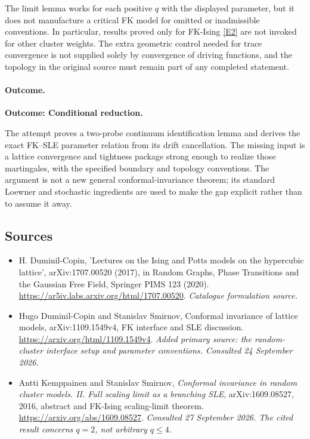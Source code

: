 \documentclass[11pt,a4paper]{article}
\newcommand{\eref}[2]{\hyperlink{extra:#1:#2}{[E#2]}}
\numberwithin{equation}{section}
\begin{document}
The limit lemma works for each positive $q$ with the displayed parameter,
but it does not manufacture a critical FK model for omitted or inadmissible
conventions. In particular, results proved only for FK-Ising
\eref{173}{2} are not invoked for other cluster weights. The extra geometric
control needed for trace convergence is not supplied solely by convergence
of driving functions, and the topology in the original source must remain
part of any completed statement.

\paragraph{Outcome.}
\textbf{Outcome: Conditional reduction.}

The attempt proves a two-probe continuum identification lemma and derives
the exact FK--SLE parameter relation from its drift cancellation. The
missing input is a lattice convergence and tightness package strong enough
to realize those martingales, with the specified boundary and topology
conventions. The argument is not a new general conformal-invariance theorem;
its standard Loewner and stochastic ingredients are used to make the gap
explicit rather than to assume it away.
\subsection{Sources}
\begin{itemize}\raggedright
\item[\textnormal{[S1]}]\hypertarget{source:173:1}{} H. Duminil-Copin, 'Lectures on the Ising and Potts models on the hypercubic lattice', arXiv:1707.00520 (2017), in Random Graphs, Phase Transitions and the Gaussian Free Field, Springer PIMS 123 (2020).
\url{https://ar5iv.labs.arxiv.org/html/1707.00520}.
{\small\textit{Catalogue formulation source.}}
\item[\textnormal{[E1]}]\hypertarget{extra:173:1}{} Hugo Duminil-Copin and Stanislav Smirnov, Conformal invariance of lattice models, arXiv:1109.1549v4, FK interface and SLE discussion.
\url{https://arxiv.org/html/1109.1549v4}.
{\small\textit{Added primary source: the random-cluster interface setup and parameter conventions. Consulted 24 September 2026.}}
\item[\textnormal{[E2]}]\hypertarget{extra:173:2}{} Antti Kemppainen and
Stanislav Smirnov, \emph{Conformal invariance in random cluster models.
II. Full scaling limit as a branching SLE}, arXiv:1609.08527, 2016,
abstract and FK-Ising scaling-limit theorem.
\url{https://arxiv.org/abs/1609.08527}.
{\small\textit{Consulted 27 September 2026. The cited result concerns
$q=2$, not arbitrary $q\le4$.}}
\end{itemize}
\end{document}
